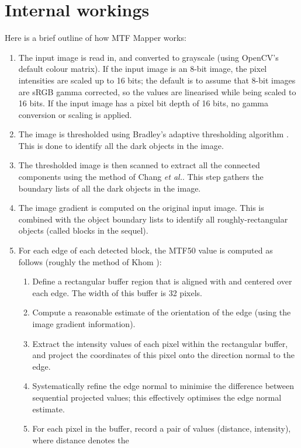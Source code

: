 \documentclass[a4paper]{article}
\begin{document}
\section{Internal workings}
\label{sec:description}
Here is a brief outline of how MTF Mapper works:
\begin{enumerate}
    \item The input image is read in, and converted to grayscale (using
OpenCV's default colour matrix). If the input image is an 8-bit image, the
pixel intensities are scaled up to 16 bits; the default is to assume that
8-bit images are sRGB gamma corrected, so the values are linearised while
being scaled to 16 bits. If the input image has a pixel bit depth of 16
bits, no gamma conversion or scaling is applied.
    \item The image is thresholded using Bradley's adaptive thresholding 
algorithm \cite{bradley}. This is done to identify all the dark objects in
the image.
    \item The thresholded image is then scanned to extract all the connected
components using the method of Chang \textit{et al.}\cite{chang}. This step
gathers the boundary lists of all the dark objects in the image.
    \item The image gradient is computed on the original input image. This
is combined with the object boundary lists to identify all
roughly-rectangular objects (called blocks in the sequel).
    \item For each edge of each detected block, the MTF50 value is computed
as follows (roughly the method of Khom \cite{khom}):
	\begin{enumerate}
	  \item Define a rectangular buffer region that is aligned with and
centered over each edge. The width of this buffer is 32 pixels.
	  \item Compute a reasonable estimate of the orientation of the edge
(using the image gradient information).
	  \item Extract the intensity values of each pixel within the
rectangular buffer, and project the coordinates of this pixel onto the
direction normal to the edge.
          \item Systematically refine the edge normal to minimise the
difference between sequential projected values; this effectively optimises
the edge normal estimate.
	  \item For each pixel in the buffer, record a pair of values
(\textsf{distance}, \textsf{intensity}), where \textsf{distance} denotes the

\end{enumerate}
\end{enumerate}
\end{document}
